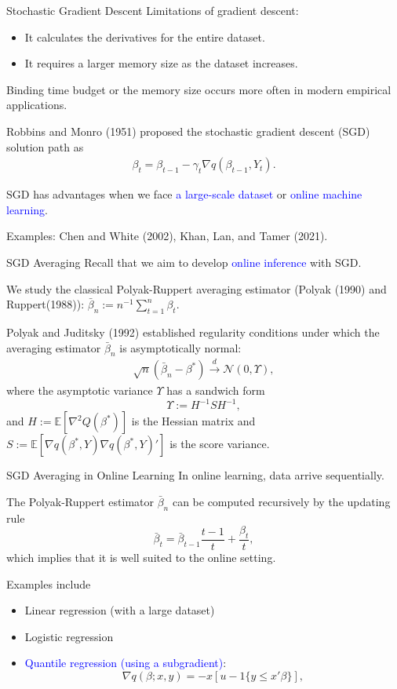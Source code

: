 \documentclass[beamer, t]{beamer}
\newcommand{\eqs}[1]{\begin{align*}#1\end{align*}}
\newcommand{\bit}{\begin{itemize}}
\newcommand{\eit}{\end{itemize}}
\newcommand{\tcb}{\textcolor{blue}}
\begin{document}
\begin{frame}{Stochastic Gradient Descent}
Limitations of gradient descent:
\bit
    \item It calculates the derivatives for the entire dataset.
    \item It requires a larger memory size as the dataset increases.
\eit
Binding time budget or the memory size occurs more often in modern empirical applications. 
\bigskip

Robbins and Monro (1951) proposed the stochastic gradient descent (SGD) solution path as
        \eqs{
            \beta_{t}=\beta_{t-1}-\gamma_{t}\nabla q\left(\beta_{t-1},Y_{t}\right).
        }

SGD has advantages when we face \tcb{a large-scale dataset} or \tcb{online machine learning}.

Examples: Chen and White (2002), Khan, Lan, and Tamer (2021). 
\end{frame}




\begin{frame}{SGD Averaging}
Recall that we aim to develop \tcb{online inference} with SGD. 
\bigskip

We study the classical Polyak-Ruppert averaging estimator (Polyak (1990) and Ruppert(1988)):
$\bar{\beta}_{n}:=n^{-1}\sum_{t=1}^{n}\beta_{t}$.
\medskip

Polyak and Juditsky (1992)
established regularity conditions under which
the averaging estimator $\bar{\beta}_{n}$ is asymptotically normal:
\begin{align*}
\sqrt{n}\left(\bar{\beta}_{n}-\beta^{*}\right)\overset{d}{\to}
\mathcal{N} (0, \Upsilon),
\end{align*}
where the asymptotic variance $\Upsilon$ has a sandwich form $$\Upsilon := H^{-1}S H^{-1},$$ and
$H := \mathbb{E}[\nabla^{2}Q\left(\beta^{*}\right)]$ is the Hessian matrix
and $S := \mathbb{E} \left[\nabla q\left(\beta^{*},Y\right)\nabla q\left(\beta^{*},Y\right)'\right]$ is the score variance.
\end{frame}


\begin{frame}{SGD Averaging in Online Learning}
In online learning, data arrive sequentially.
\bigskip


The  Polyak-Ruppert estimator $\bar{\beta}_{n}$ can be computed recursively
by the updating rule $$\bar{\beta}_{t}=\bar{\beta}_{t-1}\frac{t-1}{t}+\frac{\beta_{t}}{t},$$
which implies that it is well suited to the online setting.

\bigskip

Examples include
\bit
    \item Linear regression (with a large dataset)
    \item Logistic regression
    \item \tcb{Quantile regression (using a subgradient)}:
    		$$
			\nabla q(\beta; x,y)= - x[u-1\{y\leq x'\beta\}],
			$$
\eit
\end{frame}
\end{document}
